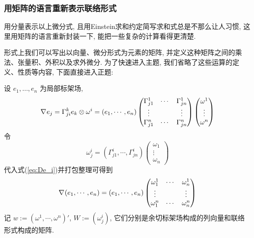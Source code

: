     \subsubsection{用矩阵的语言重新表示联络形式}
        用分量表示以上微分式, 且用Einstein求和约定简写求和式总是不那么让人习惯, 这里用矩阵的语言重新封装一下, 能把一些复杂的计算看得更清楚.
        
        形式上我们可以写出以向量、微分形式为元素的矩阵, 并定义这种矩阵之间的乘法、张量积、外积以及求外微分. 为了快速进入主题, 我们省略了这些运算的定义、性质等内容, 
        下面直接进入正题:

        设 $e_1,\dots,e_n$ 为局部标架场, 
        \begin{equation}\label{eq:De_i}
            \nabla_{}{e_j} = \Gamma_{ji}^{k}e_k\otimes\omega^i = 
            (e_1,\cdots,e_n)
            \begin{pmatrix}
                \Gamma_{j1}^{1} & \cdots & \Gamma_{jn}^{1} \\
                \vdots & & \vdots \\
                \Gamma_{j1}^{n} & \cdots & \Gamma_{jn}^{n}
            \end{pmatrix}
            \begin{pmatrix}
                \omega^1 \\ \vdots \\ \omega^n
            \end{pmatrix}
        \end{equation}
        令
        \begin{equation*}
            \omega^i_j = 
            (\Gamma_{j1}^{i},\cdots,\Gamma_{jn}^{i})
            \begin{pmatrix}
                \omega_1 \\ \vdots \\ \omega_n
            \end{pmatrix}
        \end{equation*}
        代入式(\ref{eq:De_i})并打包整理可得到
        \begin{equation}\label{df:connection-form}
            \nabla_{}{(e_1,\cdots,e_n)} = 
            (e_1,\cdots,e_n)
            \begin{pmatrix}
                \omega^1_1 & \cdots & \omega^1_n \\
                \vdots & & \vdots \\
                \omega^n_1 & \cdots & \omega^n_n
            \end{pmatrix}
        \end{equation}
        记 $w := (\omega^1,\cdots,\omega^n)'$, $W := (\omega^i_j)$,  它们分别是余切标架场构成的列向量和联络形式构成的矩阵.


